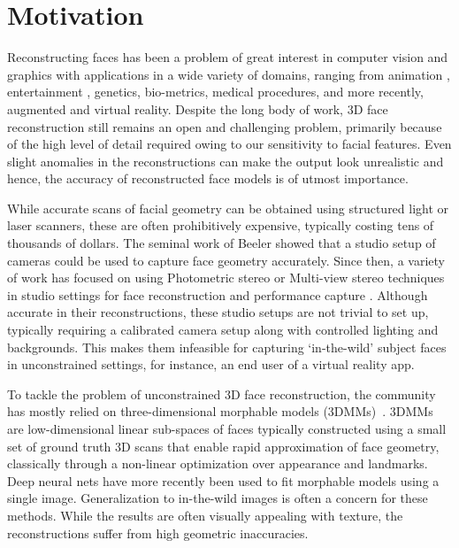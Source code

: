 
\section{Motivation}
Reconstructing faces has been a problem of great interest in computer vision and graphics with applications in a wide variety of domains, ranging from animation \cite{ichim2015dynamic}, entertainment \cite{saito2016real}, genetics, bio-metrics, medical procedures, and more recently, augmented and virtual reality. Despite the long body of work, 3D face reconstruction still remains an open and challenging problem, primarily because of the high level of detail required owing to our sensitivity to facial features. Even slight anomalies in the reconstructions can make the output look unrealistic and hence, the accuracy of reconstructed face models is of utmost importance.


While accurate scans of facial geometry can be obtained using structured light or laser scanners, these are often prohibitively expensive, typically costing tens of thousands of dollars.
The seminal work of Beeler \etal \cite{beeler2010high} showed that a studio setup of cameras could be used to capture face geometry accurately. Since then, a variety of work has focused on using Photometric stereo or Multi-view stereo techniques in studio settings for face reconstruction and performance capture \cite{cao2018sparse, fyffe2017multi}. 
Although accurate in their reconstructions, these studio setups are not trivial to set up, typically requiring a calibrated camera setup along with controlled lighting and backgrounds. This makes them infeasible for capturing `in-the-wild' subject faces in unconstrained settings, for instance, an end user of a virtual reality app.

To tackle the problem of unconstrained 3D face reconstruction, the community has mostly relied on three-dimensional morphable models (3DMMs)~\cite{blanz1999morphable}. 3DMMs are low-dimensional linear sub-spaces of faces typically constructed using a small set of ground truth 3D scans that enable rapid approximation of face geometry, classically through a non-linear optimization over appearance and landmarks. Deep neural nets have more recently been used to fit morphable models using a single image. Generalization to in-the-wild images is often a concern for these methods. While the results are often visually appealing with texture, the reconstructions suffer from high geometric inaccuracies.

